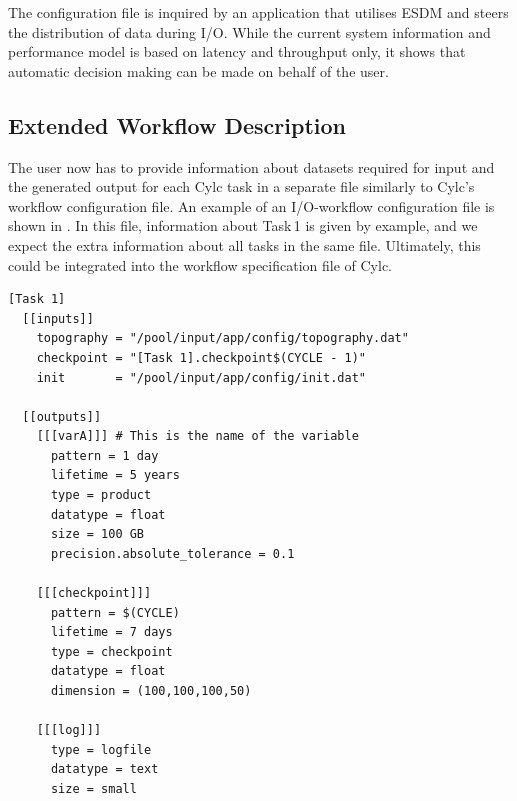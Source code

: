\documentclass{superfri}
\begin{document}
The configuration file is inquired by an application that utilises ESDM and steers the distribution of data during I/O.
While the current system information and performance model is based on latency and throughput only, it shows that automatic decision making can be made on behalf of the user.

\subsection{Extended Workflow Description}

The user now has to provide information about datasets required for input and the generated output for each Cylc task in a separate file similarly to Cylc's workflow configuration file.
An example of an I/O-workflow configuration file is shown in . In this file, information about Task\,1 is given by example, and we expect the extra information about all tasks in the same file. Ultimately, this could be integrated into the workflow specification file of Cylc.

\begin{lstlisting}[caption = External Cylc I/O-workflow configuration file, label=lst:cylc]
[Task 1]
  [[inputs]]
    topography = "/pool/input/app/config/topography.dat"
    checkpoint = "[Task 1].checkpoint$(CYCLE - 1)"
    init       = "/pool/input/app/config/init.dat"

  [[outputs]]
    [[[varA]]] # This is the name of the variable
      pattern = 1 day
      lifetime = 5 years
      type = product
      datatype = float
      size = 100 GB
      precision.absolute_tolerance = 0.1

    [[[checkpoint]]]
      pattern = $(CYCLE)
      lifetime = 7 days
      type = checkpoint
      datatype = float
      dimension = (100,100,100,50)

    [[[log]]]
      type = logfile
      datatype = text
      size = small
\end{lstlisting}
\end{document}
